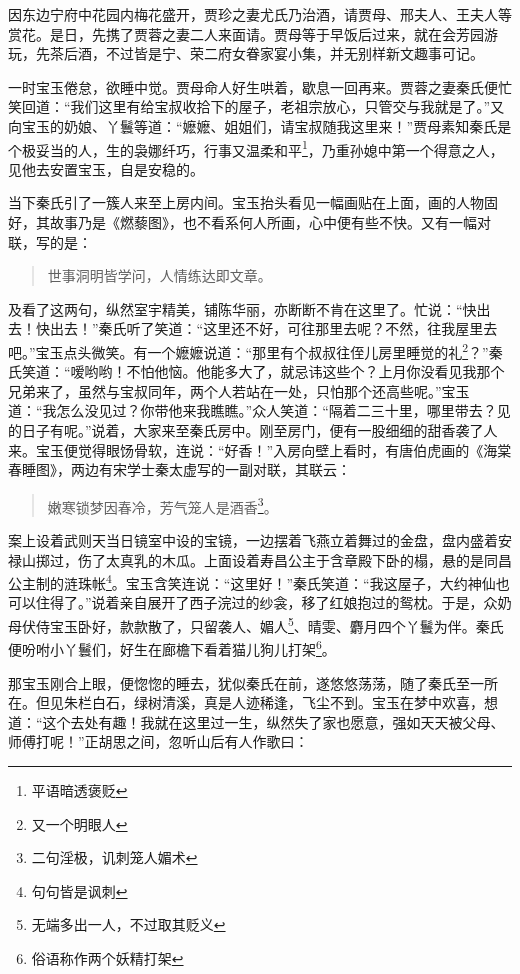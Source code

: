 \documentclass[12pt,oneside]{book}
\newenvironment{shici}{%
\begin{verse}%
\centering\large\hspace{12pt}}%
{\end{verse}}
\begin{document}
因东边宁府中花园内梅花盛开，贾珍之妻尤氏乃治酒，请贾母、邢夫人、王夫人等赏花。是日，先携了贾蓉之妻二人来面请。贾母等于早饭后过来，就在会芳园游玩，先茶后酒，不过皆是宁、荣二府女眷家宴小集，并无别样新文趣事可记。

一时宝玉倦怠，欲睡中觉。贾母命人好生哄着，歇息一回再来。贾蓉之妻秦氏便忙笑回道：“我们这里有给宝叔收拾下的屋子，老祖宗放心，只管交与我就是了。”又向宝玉的奶娘、丫鬟等道：“嬷嬷、姐姐们，请宝叔随我这里来！”贾母素知秦氏是个极妥当的人，生的袅娜纤巧，行事又温柔和平\footnote{平语暗透褒贬}，乃重孙媳中第一个得意之人，见他去安置宝玉，自是安稳的。

当下秦氏引了一簇人来至上房内间。宝玉抬头看见一幅画贴在上面，画的人物固好，其故事乃是《燃藜图》，也不看系何人所画，心中便有些不快。又有一幅对联，写的是：

\begin{shici}
世事洞明皆学问，人情练达即文章。
\end{shici}

及看了这两句，纵然室宇精美，铺陈华丽，亦断断不肯在这里了。忙说：“快出去！快出去！”秦氏听了笑道：“这里还不好，可往那里去呢？不然，往我屋里去吧。”宝玉点头微笑。有一个嬷嬷说道：“那里有个叔叔往侄儿房里睡觉的礼\footnote{又一个明眼人}？”秦氏笑道：“嗳哟哟！不怕他恼。他能多大了，就忌讳这些个？上月你没看见我那个兄弟来了，虽然与宝叔同年，两个人若站在一处，只怕那个还高些呢。”宝玉道：“我怎么没见过？你带他来我瞧瞧。”众人笑道：“隔着二三十里，哪里带去？见的日子有呢。”说着，大家来至秦氏房中。刚至房门，便有一股细细的甜香袭了人来。宝玉便觉得眼饧骨软，连说：“好香！”入房向壁上看时，有唐伯虎画的《海棠春睡图》，两边有宋学士秦太虚写的一副对联，其联云：

\begin{shici}
嫩寒锁梦因春冷，芳气笼人是酒香\footnote{二句淫极，讥刺笼人媚术}。
\end{shici}

案上设着武则天当日镜室中设的宝镜，一边摆着飞燕立着舞过的金盘，盘内盛着安禄山掷过，伤了太真乳的木瓜。上面设着寿昌公主于含章殿下卧的榻，悬的是同昌公主制的涟珠帐\footnote{句句皆是讽刺}。宝玉含笑连说：“这里好！”秦氏笑道：“我这屋子，大约神仙也可以住得了。”说着亲自展开了西子浣过的纱衾，移了红娘抱过的鸳枕。于是，众奶母伏侍宝玉卧好，款款散了，只留袭人、媚人\footnote{无端多出一人，不过取其贬义}、晴雯、麝月四个丫鬟为伴。秦氏便吩咐小丫鬟们，好生在廊檐下看着猫儿狗儿打架\footnote{俗语称作两个妖精打架}。

那宝玉刚合上眼，便惚惚的睡去，犹似秦氏在前，遂悠悠荡荡，随了秦氏至一所在。但见朱栏白石，绿树清溪，真是人迹稀逢，飞尘不到。宝玉在梦中欢喜，想道：“这个去处有趣！我就在这里过一生，纵然失了家也愿意，强如天天被父母、师傅打呢！”正胡思之间，忽听山后有人作歌曰：
\end{document}
